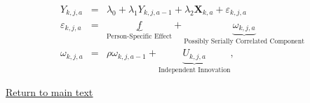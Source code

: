 \documentclass[static]{JJH-Beamer}
\begin{document}
\begin{eqnarray}
Y_{k,j,a}                   &=& \lambda_{0} + \lambda_{1} Y_{k,j,a-1} + \lambda_{2}  \bm{X}_{k,a} + \varepsilon_{k,j,a} \nonumber \\
\varepsilon_{k,j,a} &=& \underbrace{f}_{\text{Person-Specific Effect}} + \underbrace{\omega_{k,j,a}}_{\text{Possibly Serially Correlated Component}} \nonumber \\
\omega_{k,j,a}      &=& \rho \omega_{k,j,a-1} + \underbrace{U_{k,j,a}}_{\text{Independent Innovation}},
\end{eqnarray}

\begin{frame}
 \addtocounter{framenumber}{-1}

\begin{center}
\hyperlink{ret:netpresent}{\underline{Return to main text}}
\end{center}

\end{frame}
\end{document}
